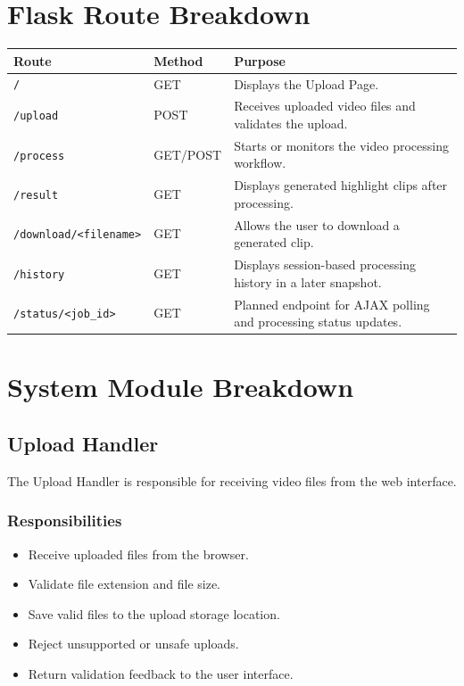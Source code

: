 \documentclass[12pt]{article}
\begin{document}
\newpage

\section{Flask Route Breakdown}

\begin{longtable}{|p{1.2in}|p{1.2in}|p{3.5in}|}
\hline
\textbf{Route} & \textbf{Method} & \textbf{Purpose} \\
\hline
\texttt{/} & GET & Displays the Upload Page. \\
\hline
\texttt{/upload} & POST & Receives uploaded video files and validates the upload. \\
\hline
\texttt{/process} & GET/POST & Starts or monitors the video processing workflow. \\
\hline
\texttt{/result} & GET & Displays generated highlight clips after processing. \\
\hline
\texttt{/download/<filename>} & GET & Allows the user to download a generated clip. \\
\hline
\texttt{/history} & GET & Displays session-based processing history in a later snapshot. \\
\hline
\texttt{/status/<job\_id>} & GET & Planned endpoint for AJAX polling and processing status updates. \\
\hline
\end{longtable}

\section{System Module Breakdown}

\subsection{Upload Handler}
The Upload Handler is responsible for receiving video files from the web interface.

\subsubsection*{Responsibilities}
\begin{itemize}[noitemsep]
    \item Receive uploaded files from the browser.
    \item Validate file extension and file size.
    \item Save valid files to the upload storage location.
    \item Reject unsupported or unsafe uploads.
    \item Return validation feedback to the user interface.
\end{itemize}
\end{document}
